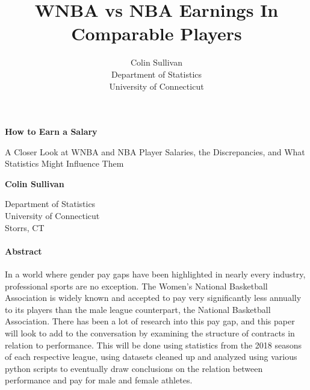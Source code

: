 \documentclass[12pt]{article}
\title{WNBA vs NBA Earnings In Comparable Players}
\author{Colin Sullivan\\
  Department of Statistics\\
  University of Connecticut
}
\begin{document}
   \begin{center}
       \vspace*{1cm}
       \Huge
       \textbf{How to Earn a Salary}

       \Large
       \vspace{0.5cm}
        A Closer Look at WNBA and NBA Player Salaries, the Discrepancies, and What Statistics Might Influence Them
            
       \vspace{1.5cm}

       \textbf{Colin Sullivan}
       
       \vfill


       \vfill
            
            
       \vspace{0.8cm}
     
         
        \Large    
       Department of Statistics\\
       University of Connecticut\\
       Storrs, CT\\
            
   \end{center}
\newpage

\paragraph{Abstract}
In a world where gender pay gaps have been highlighted in nearly every industry, professional sports are no exception. 
The Women’s National Basketball Association is widely known and accepted to pay very significantly less annually to its 
players than the male league counterpart, the National Basketball Association. There has been a lot of research into this 
pay gap, and this paper will look to add to the conversation by examining the structure of contracts in relation to performance. This will be done using statistics from the 2018 seasons of each respective league, using datasets cleaned up and analyzed using various python scripts to eventually draw conclusions on the relation between performance and pay for male and female athletes.
\end{document}
